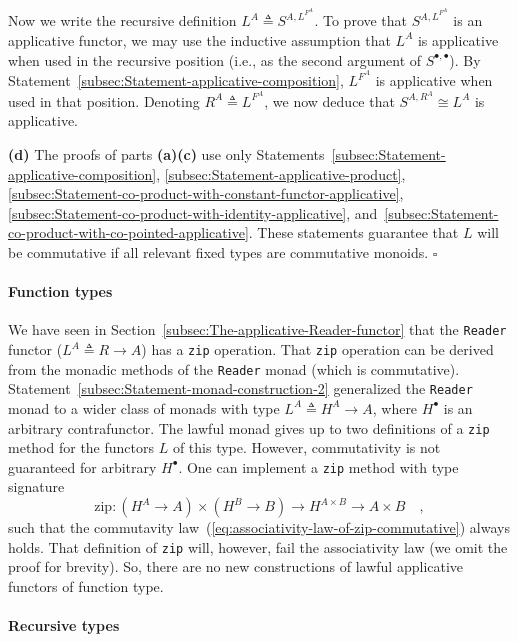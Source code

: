 Now we write the recursive definition $L^{A}\triangleq S^{A,L^{F^{A}}}$.
To prove that $S^{A,L^{F^{A}}}$ is an applicative functor, we may
use the inductive assumption that $L^{A}$ is applicative when used
in the recursive position (i.e., as the second argument of $S^{\bullet,\bullet}$).
By Statement~\ref{subsec:Statement-applicative-composition}, $L^{F^{A}}$
is applicative when used in that position. Denoting $R^{A}\triangleq L^{F^{A}}$,
we now deduce that $S^{A,R^{A}}\cong L^{A}$ is applicative.

\textbf{(d)} The proofs of parts \textbf{(a)}\textendash \textbf{(c)}
use only Statements~\ref{subsec:Statement-applicative-composition},
\ref{subsec:Statement-applicative-product}, \ref{subsec:Statement-co-product-with-constant-functor-applicative},
\ref{subsec:Statement-co-product-with-identity-applicative}, and~\ref{subsec:Statement-co-product-with-co-pointed-applicative}.
These statements guarantee that $L$ will be commutative if all relevant
fixed types are commutative monoids. $\square$

\paragraph{Function types}

We have seen in Section~\ref{subsec:The-applicative-Reader-functor}
that the \lstinline!Reader! functor ($L^{A}\triangleq R\rightarrow A$)
has a \lstinline!zip! operation. That \lstinline!zip! operation
can be derived from the monadic methods of the \lstinline!Reader!
monad (which is commutative). Statement~\ref{subsec:Statement-monad-construction-2}
generalized the \lstinline!Reader! monad to a wider class of monads
with type $L^{A}\triangleq H^{A}\rightarrow A$, where $H^{\bullet}$
is an arbitrary contrafunctor. The lawful monad gives up to two definitions
of a \lstinline!zip! method for the functors $L$ of this type. However,
commutativity is not guaranteed for arbitrary $H^{\bullet}$. One
can implement a \lstinline!zip! method with type signature
\[
\text{zip}:(H^{A}\rightarrow A)\times(H^{B}\rightarrow B)\rightarrow H^{A\times B}\rightarrow A\times B\quad,
\]
such that the commutavity law~(\ref{eq:associativity-law-of-zip-commutative})
always holds. That definition of \lstinline!zip! will, however, fail
the associativity law (we omit the proof for brevity). So, there are
no new constructions of lawful applicative functors of function type.

\paragraph{Recursive types}

